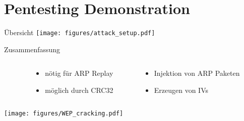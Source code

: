 {
\section{Pentesting Demonstration}

\begin{frame}
    \centering
    \tableofcontents[currentsection]
\end{frame}

\begin{frame}{Übersicht}
    \centering
    \texttt{[image: figures/attack\_setup.pdf]}
\end{frame}

\begin{frame}{Zusammenfassung}
    \fontsize{8}{8}\selectfont
    \begin{columns}
        \begin{column}{0.33\textwidth}
        \end{column}

        \begin{column}{0.33\textwidth}
            \begin{itemize}
                \item nötig für ARP Replay  
                \item möglich durch CRC32
            \end{itemize}
        \end{column}

        \begin{column}{0.33\textwidth}
            \begin{itemize}
                \item Injektion von ARP Paketen
                \item Erzeugen von IVs 
            \end{itemize}
        \end{column}
    \end{columns}

    \vspace{0.2cm}
    \begin{center}
        \texttt{[image: figures/WEP\_cracking.pdf]}
    \end{center}


\end{frame}}
